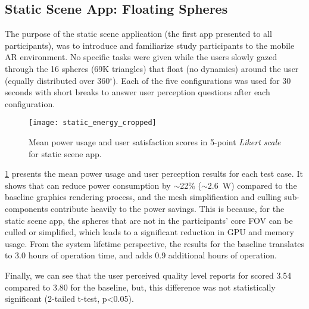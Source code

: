 
\subsection{Static Scene App: Floating Spheres}

The purpose of the static scene application (the first app presented to all participants),
was to introduce and familiarize study participants to the mobile AR environment.
%
No specific tasks were given while the users slowly gazed through the 16 spheres
(69K triangles) that float (no dynamics) around the user (equally distributed 
over 360$^\circ$). Each of the five configurations was used for 30 seconds with
short breaks to answer user perception questions after each configuration.


\begin{figure}[t]
    \centering
    \vspace{-2ex}
    \texttt{[image: static\_energy\_cropped]}
    \vspace{-3ex}
    \caption{Mean power usage and user satisfaction scores in 5-point 
            \emph{Likert scale} for static scene app.}
    \label{fig:user-static}
\end{figure}

\fig\ref{fig:user-static} presents the mean power usage and user perception 
results for each test case. 
%
It shows that {\myit} can reduce power consumption by $\sim$22\% ($\sim$2.6~W) 
compared to the baseline graphics rendering process, and the mesh simplification
and culling sub-components contribute heavily to the power savings. 
%
This is because, for the static scene app, the spheres that are not in
the participants' core FOV can be culled or simplified, which leads to 
a significant reduction in GPU and memory usage. From the system lifetime perspective, the results for the baseline translates to 3.0 hours of operation time, and {\myit} adds 0.9 additional hours of operation. 
%

Finally, we can see that the user perceived quality level reports for {\myit} scored 3.54 compared to 3.80 for the baseline, but, this difference was not statistically significant (2-tailed t-test, p<0.05).


